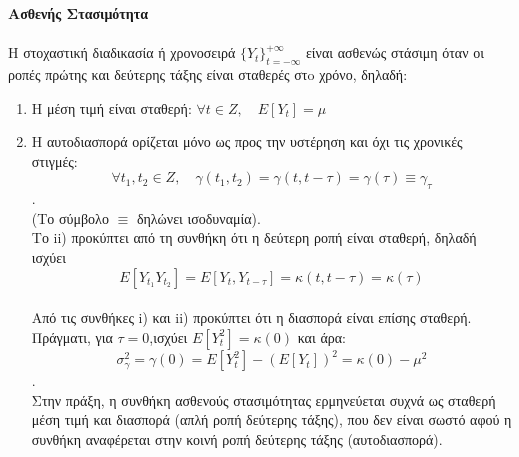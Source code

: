 \begin{dinglist}{43}
\item \textbf{ Ασθενής Στασιμότητα} \\\\
Η στοχαστική διαδικασία ή χρονοσειρά $\{Y_t\}_{t=-\infty}^{+\infty}$ είναι ασθενώς στάσιμη όταν οι ροπές πρώτης και δεύτερης τάξης είναι σταθερές στo
χρόνο, δηλαδή:\\
\begin{enumerate}
\item Η μέση τιμή είναι σταθερή: $\forall t \in Z,\quad E\left[Y_t\right]=\mu$\\
\item Η αυτοδιασπορά ορίζεται μόνο ως προς την υστέρηση και όχι τις χρονικές
στιγμές:\\ $$\forall t_1,t_2 \in Z ,\quad \gamma\left(t_1,t_2\right)=\gamma\left(t,t-\tau\right)=\gamma\left(\tau\right)\equiv\gamma_\tau $$.\\(Το σύμβολο $\equiv$ δηλώνει
ισοδυναμία). \\
Το ii) προκύπτει από τη συνθήκη ότι η δεύτερη ροπή είναι σταθερή, δηλαδή ισχύει \\
$$ E\left[Y_{t_1} Y_{t_2}\right]=E\left[Y_t,Y_{t-\tau}\right]=\kappa\left(t,t-\tau\right)=\kappa\left(\tau\right) $$\\
Από τις συνθήκες i) και ii) προκύπτει ότι η
διασπορά είναι επίσης σταθερή. Πράγματι, για $\tau=0$,ισχύει $E\left[Y_t^2\right]=\kappa\left(0\right)$ και άρα:\\
$$ \sigma_\gamma^2=\gamma\left(0\right)=E\left[Y_t^2\right]-\left(E\left[Y_t\right]\right)^2=\kappa\left(0\right)-\mu^2 $$.\\

Στην πράξη, η συνθήκη ασθενούς στασιμότητας ερμηνεύεται συχνά ως σταθερή
μέση τιμή και διασπορά (απλή ροπή δεύτερης τάξης), που δεν είναι σωστό αφού η
συνθήκη αναφέρεται στην κοινή ροπή δεύτερης τάξης (αυτοδιασπορά).
\end{enumerate}
 
\end{dinglist}
